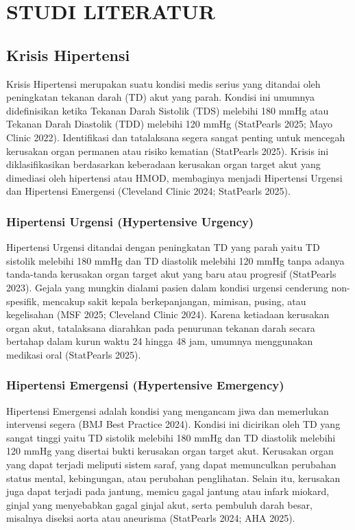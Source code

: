 \chapter{STUDI LITERATUR}
\label{chap:studi-literatur}

\section{Krisis Hipertensi}
Krisis Hipertensi merupakan suatu kondisi medis serius yang ditandai oleh peningkatan tekanan darah (TD) akut yang parah. Kondisi ini umumnya didefinisikan ketika Tekanan Darah Sistolik (TDS) melebihi 180 mmHg atau Tekanan Darah Diastolik (TDD) melebihi 120 mmHg (StatPearls 2025; Mayo Clinic 2022). Identifikasi dan tatalaksana segera sangat penting untuk mencegah kerusakan organ permanen atau risiko kematian (StatPearls 2025). Krisis ini diklasifikasikan berdasarkan keberadaan kerusakan organ target akut yang dimediasi oleh hipertensi atau HMOD, membaginya menjadi Hipertensi Urgensi dan Hipertensi Emergensi (Cleveland Clinic 2024; StatPearls 2025).

\subsection{Hipertensi Urgensi (Hypertensive Urgency)}
Hipertensi Urgensi ditandai dengan peningkatan TD yang parah yaitu TD sistolik melebihi 180 mmHg dan TD diastolik melebihi 120 mmHg tanpa adanya tanda-tanda kerusakan organ target akut yang baru atau progresif (StatPearls 2023). Gejala yang mungkin dialami pasien dalam kondisi urgensi cenderung non-spesifik, mencakup sakit kepala berkepanjangan, mimisan, pusing, atau kegelisahan (MSF 2025; Cleveland Clinic 2024). Karena ketiadaan kerusakan organ akut, tatalaksana diarahkan pada penurunan tekanan darah secara bertahap dalam kurun waktu 24 hingga 48 jam, umumnya menggunakan medikasi oral (StatPearls 2025).

\subsection{Hipertensi Emergensi (Hypertensive Emergency)}
Hipertensi Emergensi adalah kondisi yang mengancam jiwa dan memerlukan intervensi segera (BMJ Best Practice 2024). Kondisi ini dicirikan oleh TD yang sangat tinggi yaitu TD sistolik melebihi 180 mmHg dan TD diastolik melebihi 120 mmHg yang disertai bukti kerusakan organ target akut. Kerusakan organ yang dapat terjadi meliputi sistem saraf, yang dapat memunculkan perubahan status mental, kebingungan, atau perubahan penglihatan. Selain itu, kerusakan juga dapat terjadi pada jantung, memicu gagal jantung atau infark miokard, ginjal yang menyebabkan gagal ginjal akut, serta pembuluh darah besar, misalnya diseksi aorta atau aneurisma (StatPearls 2024; AHA 2025).

